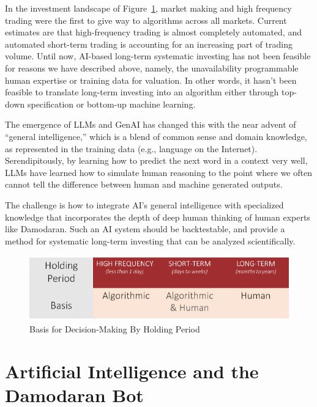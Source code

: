 \documentclass[]{interact}
\theoremstyle{plain}%
\theoremstyle{definition}
\theoremstyle{remark}
\begin{document}
In the investment landscape of Figure~\ref{fig:holding-period}, market making and high frequency trading were the first to give way to algorithms across all markets. Current   estimates are that high-frequency trading is almost completely automated, and automated short-term trading is accounting for an increasing part of trading volume. Until now, AI-based long-term systematic investing has not been feasible for reasons we have described above, namely, the unavailability programmable  human expertise or  training data for valuation. In other words, it hasn’t been feasible to translate long-term investing into an algorithm either through top-down specification or bottom-up machine learning.

The emergence of LLMs and GenAI has changed this with the near advent of “general intelligence,” which is a blend of common sense and domain knowledge, as represented in the training data (e.g., language on the Internet). Serendipitously, by learning how to predict the next word in a context very well, LLMs have learned how to simulate human reasoning to the point where we often cannot tell the difference between human and machine generated outputs.

The challenge is how to integrate AI’s general intelligence with specialized knowledge that incorporates the depth of deep human thinking of human experts like Damodaran. Such an AI system should be backtestable, and provide a method for systematic long-term investing that can be analyzed scientifically. 

\begin{figure}[h]
    \centering
    \includegraphics[width=0.9\linewidth]{figures/basis_holding_period.png}
    \caption{Basis for Decision-Making By Holding Period}
    \label{fig:holding-period}
\end{figure}

\section{Artificial Intelligence and the Damodaran Bot}
\end{document}
